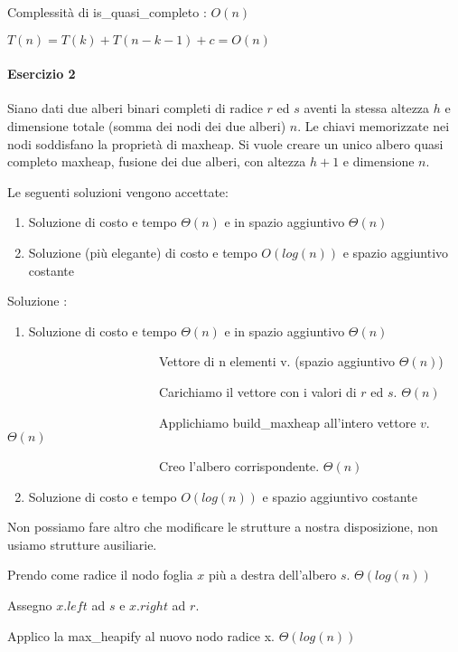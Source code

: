 {Complessità di is\_quasi\_completo : $O(n)$}

$T(n) = T(k) + T(n-k-1) + c = O(n)$

\paragraph{Esercizio 2}

{Siano dati due alberi binari completi di radice $r$ ed $s$ aventi la stessa altezza $h$ e dimensione totale (somma dei nodi dei due alberi) $n$. Le chiavi memorizzate nei nodi soddisfano la proprietà di maxheap. Si vuole creare un unico albero quasi completo maxheap, fusione dei due alberi, con altezza $h+1$ e dimensione $n$.}

{Le seguenti soluzioni vengono accettate:}

\begin{enumerate}
\tightlist
\item
  {Soluzione di costo e tempo $\Theta(n)$ e in spazio aggiuntivo $\Theta(n)$}
\item
  {Soluzione (più elegante) di costo e tempo $O(log(n))$ e spazio aggiuntivo costante}
\end{enumerate}

{Soluzione :}

\begin{enumerate}
\tightlist
\item
  {Soluzione di costo e tempo $\Theta(n)$ e in spazio aggiuntivo $\Theta(n)$}
\end{enumerate}

{~~~~~~~~~~~~~~~~~~~~~~~~Vettore di n elementi v. (spazio aggiuntivo $\Theta(n)$)}

{~~~~~~~~~~~~~~~~~~~~~~~~Carichiamo il vettore con i valori di $r$ ed $s$. $\Theta(n)$}

{~~~~~~~~~~~~~~~~~~~~~~~~Applichiamo build\_maxheap all'intero vettore $v$. $\Theta(n)$}

{~~~~~~~~~~~~~~~~~~~~~~~~Creo l'albero corrispondente. $\Theta(n)$}

\begin{enumerate}
\setcounter{enumi}{1}
\tightlist
\item
  {Soluzione di costo e tempo $O(log(n))$ e spazio aggiuntivo costante}
\end{enumerate}

{Non possiamo fare altro che modificare le strutture a nostra disposizione, non usiamo strutture ausiliarie.}

{Prendo come radice il nodo foglia $x$ più a destra dell'albero $s$. $\Theta(log(n))$}

{Assegno $x.left$ ad $s$ e $x.right$ ad $r$.}

{Applico la max\_heapify al nuovo nodo radice x. $\Theta(log(n))$}
